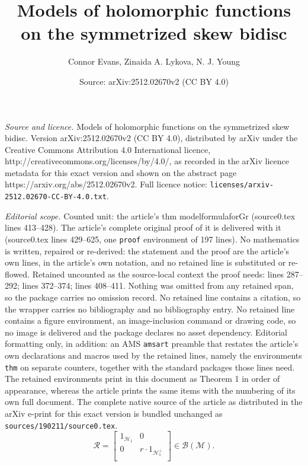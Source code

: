 \documentclass[10pt,a4paper]{amsart}
\title{Models of holomorphic functions on \newline the symmetrized skew bidisc}
\author{Connor Evans, Zinaida A. Lykova, N. J. Young}
\date{Source: arXiv:2512.02670v2 (CC BY 4.0)}
\begin{document}
\maketitle

\noindent\emph{Source and licence.} Models of holomorphic functions on \newline the symmetrized skew bidisc. Version arXiv:2512.02670v2 (CC BY 4.0), distributed by arXiv under the Creative Commons Attribution 4.0 International licence, http://creativecommons.org/licenses/by/4.0/, as recorded in the arXiv licence metadata for this exact version and shown on the abstract page https://arxiv.org/abs/2512.02670v2. Full licence notice: \texttt{licenses/arxiv-2512.02670-CC-BY-4.0.txt}.\par\smallskip

\noindent\textit{Editorial scope.} Counted unit: the article's thm modelformulaforGr (source0.tex lines 413--428). The article's complete original proof of it is delivered with it (source0.tex lines 429--625, one \texttt{proof} environment of 197 lines). No mathematics is written, repaired or re-derived: the statement and the proof are the article's own lines, in the article's own notation, and no retained line is substituted or re-flowed.  Retained uncounted as the source-local context the proof needs: lines 287--292; lines 372--374; lines 408--411.  Nothing was omitted from any retained span, so the package carries no omission record.  No retained line contains a citation, so the wrapper carries no bibliography and no bibliography entry.  No retained line contains a figure environment, an image-inclusion command or drawing code, so no image is delivered and the package declares no asset dependency.  Editorial formatting only, in addition: an AMS \texttt{amsart} preamble that restates the article's own declarations and macros used by the retained lines, namely the environments \texttt{thm} on separate counters, together with the standard packages those lines need.  The retained environments print in this document as Theorem 1 in order of appearance, whereas the article prints the same items with the numbering of its own full document.  The complete native source of the article as distributed in the arXiv e-print for this exact version is bundled unchanged as \texttt{sources/190211/source0.tex}.
\begin{equation} \label{RonM-intro}
\mathcal{R}=\begin{bmatrix}
	1_{\mathcal{H}_{1}  } 	& 0                \\
	0 		& r\cdot 1_{\mathcal{H}_{1}^{\perp}}  	\\
\end{bmatrix}\in\mathcal{B(M)}.
\end{equation}
\end{document}
